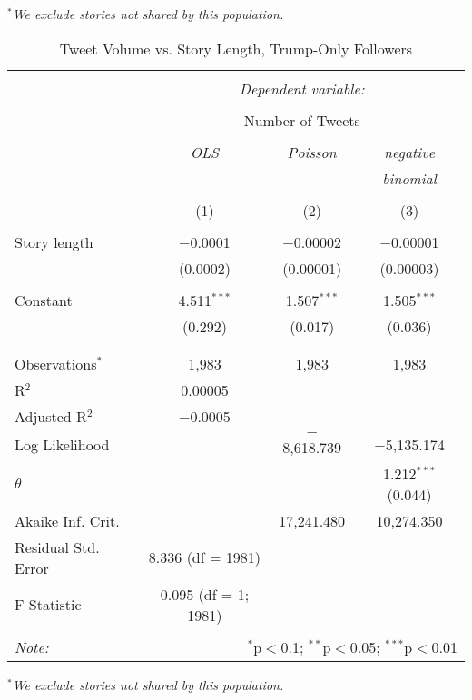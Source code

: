 \emph{$^{*}$We exclude stories not shared by this population.} 
\newpage 
\begin{table}[!htbp] \centering 
  \caption{Tweet Volume vs. Story Length, Trump-Only Followers} 
  \label{} 
    \begin{tabular}{@{\extracolsep{5pt}}lccc} 
    \\[-1.8ex]\hline 
    \hline \\[-1.8ex] 
     & \multicolumn{3}{c}{\textit{Dependent variable:}} \\ 
    \cline{2-4} 
    \\[-1.8ex] & \multicolumn{3}{c}{Number of Tweets} \\ 
    \\[-1.8ex] & \textit{OLS} & \textit{Poisson} & \textit{negative} \\ 
     & \textit{} & \textit{} & \textit{binomial} \\ 
    \\[-1.8ex] & (1) & (2) & (3)\\ 
    \hline \\[-1.8ex] 
     Story length & $-$0.0001 & $-$0.00002 & $-$0.00001 \\ 
      & (0.0002) & (0.00001) & (0.00003) \\ 
      & & & \\ 
     Constant & 4.511$^{***}$ & 1.507$^{***}$ & 1.505$^{***}$ \\ 
      & (0.292) & (0.017) & (0.036) \\ 
      & & & \\ 
    \hline \\[-1.8ex] 
    Observations$^{*}$ & 1,983 & 1,983 & 1,983 \\ 
    R$^{2}$ & 0.00005 &  &  \\ 
    Adjusted R$^{2}$ & $-$0.0005 &  &  \\ 
    Log Likelihood &  & $-$8,618.739 & $-$5,135.174 \\ 
    $\theta$ &  &  & 1.212$^{***}$  (0.044) \\ 
    Akaike Inf. Crit. &  & 17,241.480 & 10,274.350 \\ 
    Residual Std. Error & 8.336 (df = 1981) &  &  \\ 
    F Statistic & 0.095 (df = 1; 1981) &  &  \\ 
    \hline 
    \hline \\[-1.8ex] 
    \textit{Note:}  & \multicolumn{3}{r}{$^{*}$p$<$0.1; $^{**}$p$<$0.05; $^{***}$p$<$0.01} \\ 
    \end{tabular} 
\end{table} 
\emph{$^{*}$We exclude stories not shared by this population.} 
\newpage 

